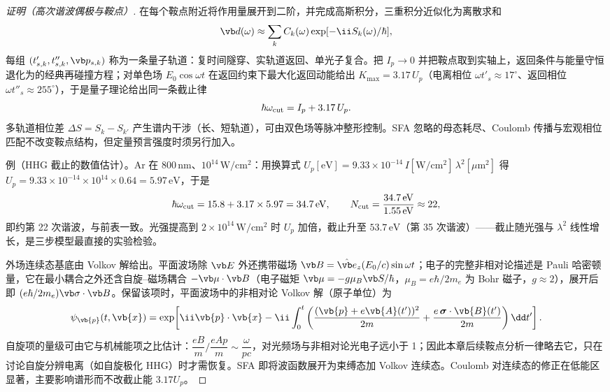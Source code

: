 \begin{proof}[证明（高次谐波偶极与鞍点）]
在每个鞍点附近将作用量展开到二阶，并完成高斯积分，三重积分近似化为离散求和
\begin{equation*}
\vb d(\omega)\approx\sum_k C_k(\omega)\exp[-\ii S_k(\omega)/\hbar],
\end{equation*}
每组 $(t'_{s,k},t''_{s,k},\vb p_{s,k})$ 称为一条量子轨道：复时间隧穿、实轨道返回、单光子复合。把 $I_p\to0$ 并把鞍点取到实轴上，返回条件与能量守恒退化为的经典再碰撞方程；对单色场 $E_0\cos\omega t$ 在返回约束下最大化返回动能给出 $K_{\max}=3.17\,U_p$（电离相位 $\omega t'_s\approx17^\circ$、返回相位 $\omega t''_s\approx255^\circ$），于是量子理论给出同一条截止律
\begin{equation*}
\hbar\omega_{\rm cut}=I_p+3.17\,U_p.
\end{equation*}
多轨道相位差 $\Delta S=S_k-S_{k'}$ 产生谱内干涉（长、短轨道），可由双色场等脉冲整形控制。SFA 忽略的母态耗尽、Coulomb 传播与宏观相位匹配不改变鞍点结构，但定量预言强度时须另行加入。

例（HHG 截止的数值估计）。Ar 在 800\,nm、$10^{14}\,\mathrm{W/cm^2}$：用换算式 $U_p[\mathrm{eV}]=9.33\times10^{-14}\,I[\mathrm{W/cm^2}]\,\lambda^2[\mu\mathrm m^2]$ 得 $U_p=9.33\times10^{-14}\times10^{14}\times0.64=5.97\,\mathrm{eV}$，于是
\begin{equation*}
\hbar\omega_{\rm cut}=15.8+3.17\times5.97=34.7\,\mathrm{eV},
\qquad
N_{\rm cut}=\frac{34.7\,\mathrm{eV}}{1.55\,\mathrm{eV}}\approx22,
\end{equation*}
即约第 22 次谐波，与前表一致。光强提高到 $2\times10^{14}\,\mathrm{W/cm^2}$ 时 $U_p$ 加倍，截止升至 $53.7\,\mathrm{eV}$（第 35 次谐波）——截止随光强与 $\lambda^2$ 线性增长，是三步模型最直接的实验检验。

外场连续态基底由 Volkov 解给出。平面波场除 $\vb E$ 外还携带磁场 $\vb B=\hat{\vb e}_z(E_0/c)\sin\omega t$；电子的完整非相对论描述是 Pauli 哈密顿量，它在最小耦合之外还含自旋--磁场耦合 $-\vb\mu\cdot\vb B$（电子磁矩 $\vb\mu=-g\mu_B\vb S/\hbar$，$\mu_B=e\hbar/2m_e$ 为 Bohr 磁子，$g\approx2$），展开后即 $(e\hbar/2m_e)\vb\sigma\cdot\vb B$。保留该项时，平面波场中的非相对论 Volkov 解（原子单位）为
\begin{equation}
  \psi_{\vb{p}}(t,\vb{x})=\exp\!\left[\ii\vb{p}\cdot\vb{x}-\ii\int_0^t\left(\frac{(\vb{p}+e\vb{A}(t'))^2}{2m}+\frac{e\,\boldsymbol\sigma\cdot\vb{B}(t')}{2m}\right)\dd t'\right].
  \label{eq:phys-sf-volkov-nonrel}
\end{equation}
自旋项的量级可由它与机械能项之比估计：$\dfrac{eB}{m}\Big/\dfrac{eAp}{m}\sim\dfrac{\omega}{pc}$，对光频场与非相对论光电子远小于 1；因此本章后续鞍点分析一律略去它，只在讨论自旋分辨电离（如自旋极化 HHG）时才需恢复。SFA 即将波函数展开为束缚态加 Volkov 连续态。Coulomb 对连续态的修正在低能区显著，主要影响谱形而不改截止能 \(3.17U_p\)。
\end{proof}







